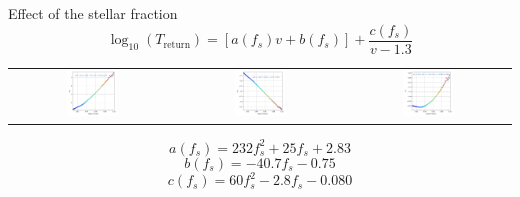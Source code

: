 \documentclass{beamer}
\begin{document}
\begin{frame}{Effect of the stellar fraction}
	\small
	\begin{equation}\label{eq: fitTr}
	\log_{10}(T_\text{return}) = [a(f_s) v + b(f_s)] + \dfrac{c(f_s)}{v - 1.3}
	\end{equation}
	\begin{table}[h]
		\centering
		\begin{tabular}{ccc}
			\includegraphics[width = 0.33\textwidth]{"../Files/Week 10/a"} & 
			\includegraphics[width = 0.33\textwidth]{"../Files/Week 10/b"} & 
			\includegraphics[width = 0.33\textwidth]{"../Files/Week 10/c"}
		\end{tabular}
	\end{table}
	\small
	\begin{equation}
		a(f_s) = 232f_s^2 + 25 f_s + 2.83
	\end{equation} 
	\begin{equation}
		b(f_s) = -40.7 f_s - 0.75
	\end{equation}
	\begin{equation}
		c(f_s) = 60 f_s^2 - 2.8 f_s - 0.080
	\end{equation}
\end{frame}
\end{document}
